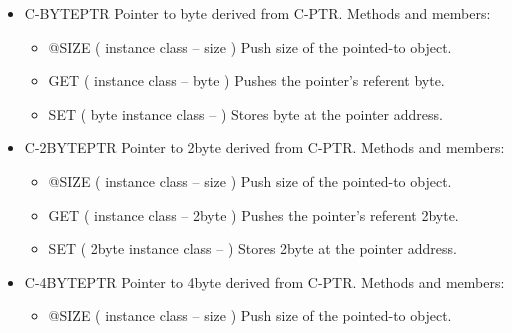 \begin{;stlisting}[frame=single]
\begin{itemize}[noitemsep]
\begin{itemize}[noitemsep]
		\item DEC-PTR ( instance class -- )\newline
		Subtracts @SIZE to the pointer address.

		\item INDEX-PTR ( i instance class -- )\newline
		Adds i * @SIZE to the pointer address.
	\end{itemize}

	\item C-BYTEPTR\newline
	Pointer to byte derived from C-PTR. Methods and members:
	\begin{itemize}[noitemsep]
		\item @SIZE ( instance class -- size )\newline
		Push size of the pointed-to object.

		\item GET ( instance class -- byte )\newline
		Pushes the pointer's referent byte.

		\item SET ( byte instance class -- )\newline
		Stores byte at the pointer address.
	\end{itemize}

	\item C-2BYTEPTR\newline
	Pointer to 2byte derived from C-PTR. Methods and members:
	\begin{itemize}[noitemsep]
		\item @SIZE ( instance class -- size )\newline
		Push size of the pointed-to object.

		\item GET ( instance class -- 2byte )\newline
		Pushes the pointer's referent 2byte.

		\item SET ( 2byte instance class -- )\newline
		Stores 2byte at the pointer address.
	\end{itemize}

	\item C-4BYTEPTR\newline
	Pointer to 4byte derived from C-PTR. Methods and members:
	\begin{itemize}[noitemsep]
		\item @SIZE ( instance class -- size )\newline
		Push size of the pointed-to object.


\end{itemize}
\end{itemize}
\end{;stlisting}
